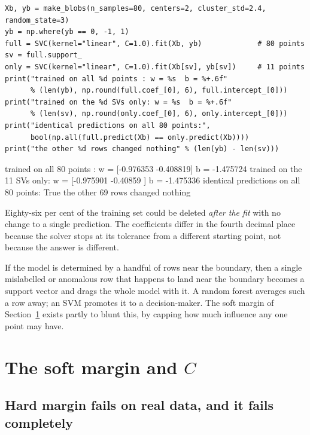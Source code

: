 \documentclass[11pt]{article}
\begin{document}
\begin{lstlisting}
Xb, yb = make_blobs(n_samples=80, centers=2, cluster_std=2.4, random_state=3)
yb = np.where(yb == 0, -1, 1)
full = SVC(kernel="linear", C=1.0).fit(Xb, yb)             # 80 points
sv = full.support_
only = SVC(kernel="linear", C=1.0).fit(Xb[sv], yb[sv])     # 11 points
print("trained on all %d points : w = %s  b = %+.6f"
      % (len(yb), np.round(full.coef_[0], 6), full.intercept_[0]))
print("trained on the %d SVs only: w = %s  b = %+.6f"
      % (len(sv), np.round(only.coef_[0], 6), only.intercept_[0]))
print("identical predictions on all 80 points:",
      bool(np.all(full.predict(Xb) == only.predict(Xb))))
print("the other %d rows changed nothing" % (len(yb) - len(sv)))
\end{lstlisting}
\begin{codeout}
trained on all 80 points : w = [-0.976353 -0.408819]  b = -1.475724
trained on the 11 SVs only: w = [-0.975901 -0.40859 ]  b = -1.475336
identical predictions on all 80 points: True
the other 69 rows changed nothing
\end{codeout}

Eighty-six per cent of the training set could be deleted \emph{after the fit}
with no change to a single prediction. The coefficients differ in the fourth
decimal place because the solver stops at its tolerance from a different
starting point, not because the answer is different.

\begin{caution}
If the model is determined by a handful of rows near the boundary, then a
single mislabelled or anomalous row that happens to land near the boundary
becomes a support vector and drags the whole model with it. A random forest
averages such a row away; an SVM promotes it to a decision-maker. The soft
margin of Section~\ref{sec:soft} exists partly to blunt this, by capping how
much influence any one point may have.
\end{caution}

\section{The soft margin and $C$}
\label{sec:soft}

\subsection{Hard margin fails on real data, and it fails completely}
\end{document}
